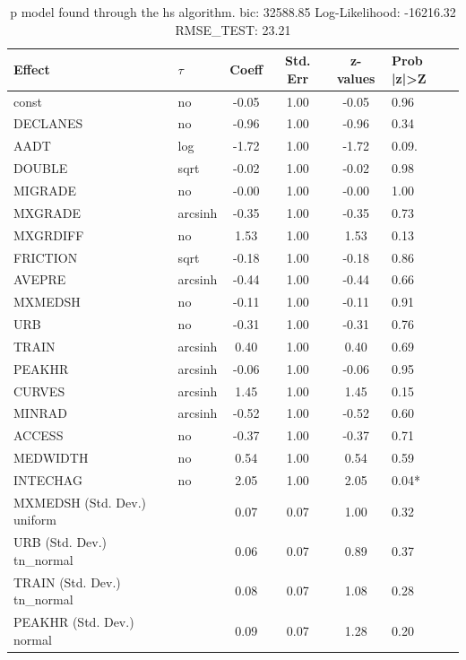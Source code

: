 \begin{table}
	\caption{p model found through the hs algorithm. bic: 32588.85 Log-Likelihood: -16216.32 RMSE_TEST: 23.21}
	\begin{center}
		\begin{tabular}{|l|l|c|c|c|l|}
			\hline
			Effect & $\tau$ & Coeff & Std. Err & z-values & Prob |z|>Z \\
			\hline
			const & no & -0.05 & 1.00 & -0.05 & 0.96 \\
			\hline
			DECLANES & no & -0.96 & 1.00 & -0.96 & 0.34 \\
			\hline
			AADT & log & -1.72 & 1.00 & -1.72 & 0.09. \\
			\hline
			DOUBLE & sqrt & -0.02 & 1.00 & -0.02 & 0.98 \\
			\hline
			MIGRADE & no & -0.00 & 1.00 & -0.00 & 1.00 \\
			\hline
			MXGRADE & arcsinh & -0.35 & 1.00 & -0.35 & 0.73 \\
			\hline
			MXGRDIFF & no & 1.53 & 1.00 & 1.53 & 0.13 \\
			\hline
			FRICTION & sqrt & -0.18 & 1.00 & -0.18 & 0.86 \\
			\hline
			AVEPRE & arcsinh & -0.44 & 1.00 & -0.44 & 0.66 \\
			\hline
			MXMEDSH & no & -0.11 & 1.00 & -0.11 & 0.91 \\
			\hline
			URB & no & -0.31 & 1.00 & -0.31 & 0.76 \\
			\hline
			TRAIN & arcsinh & 0.40 & 1.00 & 0.40 & 0.69 \\
			\hline
			PEAKHR & arcsinh & -0.06 & 1.00 & -0.06 & 0.95 \\
			\hline
			CURVES & arcsinh & 1.45 & 1.00 & 1.45 & 0.15 \\
			\hline
			MINRAD & arcsinh & -0.52 & 1.00 & -0.52 & 0.60 \\
			\hline
			ACCESS & no & -0.37 & 1.00 & -0.37 & 0.71 \\
			\hline
			MEDWIDTH & no & 0.54 & 1.00 & 0.54 & 0.59 \\
			\hline
			INTECHAG & no & 2.05 & 1.00 & 2.05 & 0.04* \\
			\hline
			MXMEDSH (Std. Dev.) uniform &  & 0.07 & 0.07 & 1.00 & 0.32 \\
			\hline
			URB (Std. Dev.) tn_normal &  & 0.06 & 0.07 & 0.89 & 0.37 \\
			\hline
			TRAIN (Std. Dev.) tn_normal &  & 0.08 & 0.07 & 1.08 & 0.28 \\
			\hline
			PEAKHR (Std. Dev.) normal &  & 0.09 & 0.07 & 1.28 & 0.20 \\

\end{tabular}
\end{center}
\end{table}
